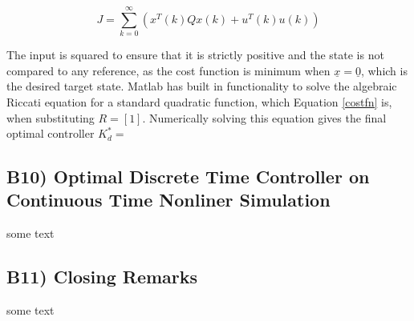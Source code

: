 \documentclass{article}
\begin{document}
\begin{equation}\label{costfn}
    J = \sum_{k=0}^{\infty} \left( x^T(k) Q x(k) + u^T(k) u(k) \right)
\end{equation}

The input is squared to ensure that it is strictly positive and the state is not compared to any reference, as the cost function is minimum when $\underline{x}=\underline{0}$, which is the desired target state. Matlab has built in functionality to solve the algebraic Riccati equation for a standard quadratic function, which Equation \ref{costfn} is, when substituting $R=[1]$. Numerically solving this equation gives the final optimal controller $K^*_d=$


\subsection*{B10) Optimal Discrete Time Controller on Continuous Time Nonliner Simulation}
some text


\subsection*{B11) Closing Remarks}
some text
\end{document}
